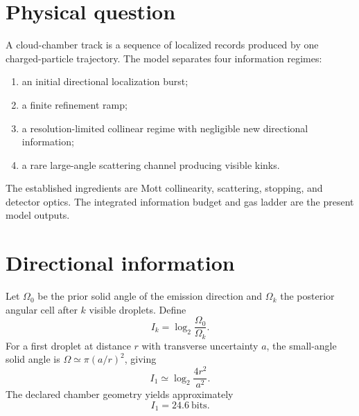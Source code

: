 \documentclass[11pt,a4paper]{article}
\begin{document}
\MakeResearchTitle
\MakeResearchContents
{}
\section{Physical question}
A cloud-chamber track is a sequence of localized records produced by one charged-particle trajectory. The model separates four information regimes:
\begin{enumerate}
\item an initial directional localization burst;
\item a finite refinement ramp;
\item a resolution-limited collinear regime with negligible new directional information;
\item a rare large-angle scattering channel producing visible kinks.
\end{enumerate}
The established ingredients are Mott collinearity, scattering, stopping, and detector optics. The integrated information budget and gas ladder are the present model outputs.

\section{Directional information}
Let $\Omega_0$ be the prior solid angle of the emission direction and $\Omega_k$ the posterior angular cell after $k$ visible droplets. Define
\begin{equation}
I_k=\log_2\frac{\Omega_0}{\Omega_k}.
\end{equation}
For a first droplet at distance $r$ with transverse uncertainty $a$, the small-angle solid angle is $\Omega\simeq\pi(a/r)^2$, giving
\begin{equation}
I_1\simeq\log_2\frac{4r^2}{a^2}.
\end{equation}
The declared chamber geometry yields approximately
\begin{equation}
\boxed{I_1=24.6\ \text{bits}.}
\end{equation}
\end{document}

